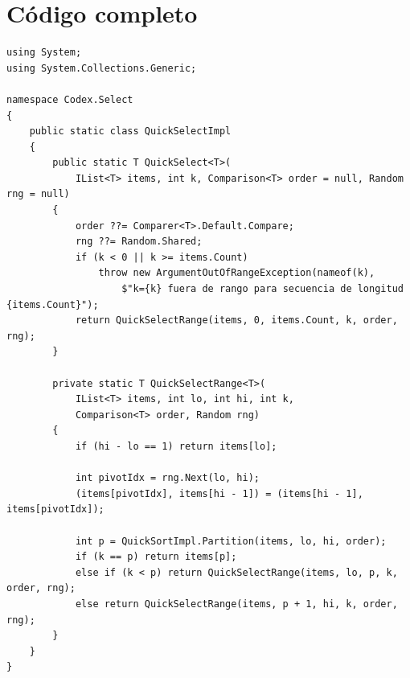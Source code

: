 \documentclass[11pt,a4paper]{article}
\begin{document}
\section{Código completo}

\begin{lstlisting}[caption={\texttt{QuickSelect.cs} --- quickselect}]
using System;
using System.Collections.Generic;

namespace Codex.Select
{
    public static class QuickSelectImpl
    {
        public static T QuickSelect<T>(
            IList<T> items, int k, Comparison<T> order = null, Random rng = null)
        {
            order ??= Comparer<T>.Default.Compare;
            rng ??= Random.Shared;
            if (k < 0 || k >= items.Count)
                throw new ArgumentOutOfRangeException(nameof(k),
                    $"k={k} fuera de rango para secuencia de longitud {items.Count}");
            return QuickSelectRange(items, 0, items.Count, k, order, rng);
        }

        private static T QuickSelectRange<T>(
            IList<T> items, int lo, int hi, int k,
            Comparison<T> order, Random rng)
        {
            if (hi - lo == 1) return items[lo];

            int pivotIdx = rng.Next(lo, hi);
            (items[pivotIdx], items[hi - 1]) = (items[hi - 1], items[pivotIdx]);

            int p = QuickSortImpl.Partition(items, lo, hi, order);
            if (k == p) return items[p];
            else if (k < p) return QuickSelectRange(items, lo, p, k, order, rng);
            else return QuickSelectRange(items, p + 1, hi, k, order, rng);
        }
    }
}
\end{lstlisting}
\end{document}
